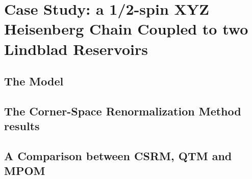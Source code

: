 \chapter{Case Study: a 1/2-spin XYZ Heisenberg Chain Coupled to two Lindblad Reservoirs}
\label{Chapter3}

\section{The Model}
\section{The Corner-Space Renormalization Method results}
\section{A Comparison between CSRM, QTM and MPOM}